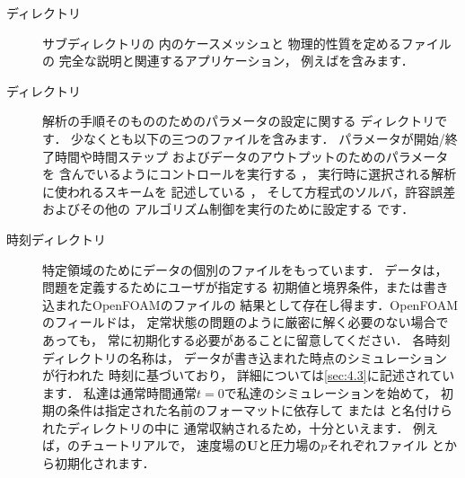 \begin{description}
 \item[ディレクトリ]
%
%
            サブディレクトリの
%
%
            内のケースメッシュと
            物理的性質を定めるファイルの
            完全な説明と関連するアプリケーション，
            例えばを含みます．
 \item[ディレクトリ]
%
%
            解析の手順そのもののためのパラメータの設定に関する
            ディレクトリです．
            少なくとも以下の三つのファイルを含みます．
            パラメータが開始/終了時間や時間ステップ
            およびデータのアウトプットのためのパラメータを
            含んでいるようにコントロールを実行する
%
%
            ，
            実行時に選択される解析に使われるスキームを
            記述している
%
%
            ，
            そして方程式のソルバ，許容誤差およびその他の
            アルゴリズム制御を実行のために設定する
%
%
            です．
 \item[時刻ディレクトリ]
            特定領域のためにデータの個別のファイルをもっています．
            データは，問題を定義するためにユーザが指定する
            初期値と境界条件，または書き込まれたOpenFOAMのファイルの
            結果として存在し得ます．OpenFOAMのフィールドは，
            定常状態の問題のように厳密に解く必要のない場合であっても，
            常に初期化する必要があることに留意してください．
            各時刻ディレクトリの名称は，
            データが書き込まれた時点のシミュレーションが行われた
            時刻に基づいており，
            詳細については\autoref{sec:4.3}に記述されています．
            私達は通常時間通常$t = 0$で私達のシミュレーションを始めて，
            初期の条件は指定された名前のフォーマットに依存して
%
%
            または
%
%
            と名付けられたディレクトリの中に
            通常収納されるため，十分といえます．
            例えば，のチュートリアルで，
            速度場の$\bm{U}$と圧力場の$p$それぞれファイル
            とから初期化されます．
\end{description}



